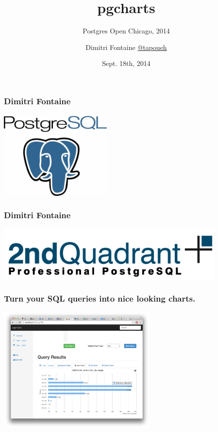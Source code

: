 \documentclass{beamer}
\title{pgcharts}
\subtitle{Postgres Open Chicago, 2014}
\author{Dimitri Fontaine \linebreak \url{@tapoueh}}
\date{Sept. 18th, 2014}
\begin{document}
\frame{\titlepage}

\begin{frame}
  \frametitle{Dimitri Fontaine}

  \begin{center}
    \includegraphics[height=12em]{postgres-logo.png}
  \end{center}
\end{frame}

\begin{frame}
  \frametitle{Dimitri Fontaine}

  \begin{center}
    \includegraphics[height=1.1in]{2ndquadrant_logo_full_color.jpg}
  \end{center}
\end{frame}

\begin{frame}
  \frametitle{Turn your SQL queries into nice looking charts.}


  \begin{center}
    \includegraphics[height=2.5in]{pgcharts-bar-chart.png}
  \end{center}
\end{frame}
\end{document}
